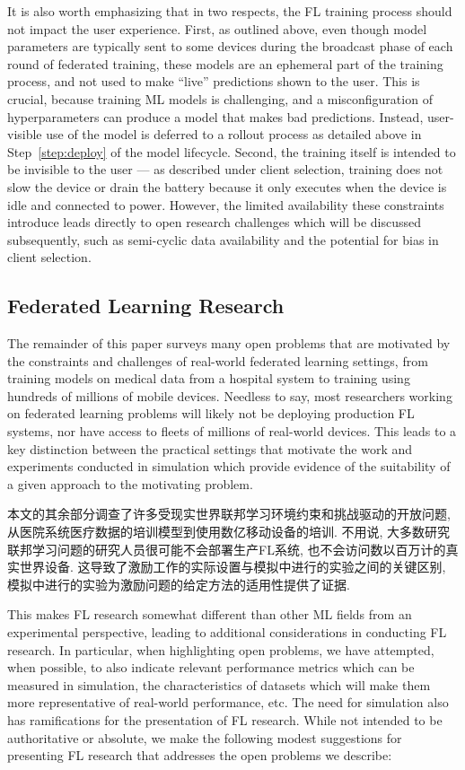 It is also worth emphasizing that in two respects, the FL training process should not impact the user experience. First, as outlined above, even though model parameters are typically sent to some devices during the broadcast phase of each round of federated training, these models are an ephemeral part of the training process, and not used to make ``live'' predictions shown to the user.  This is crucial, because training ML models is challenging, and a misconfiguration of hyperparameters can produce a model that makes bad predictions. Instead, user-visible use of the model is deferred to a rollout process as detailed above in Step~\ref{step:deploy} of the model lifecycle. Second, the training itself is intended to be invisible to the user --- as described under client selection, training does not slow the device or drain the battery because it only executes when the device is idle and connected to power. However, the limited availability these constraints introduce leads directly to open research challenges which will be discussed subsequently, such as semi-cyclic data availability and the potential for bias in client selection. 


\subsection{Federated Learning Research}\label{sec:fl-research}
The remainder of this paper surveys many open problems that are motivated by the constraints and challenges of real-world federated learning settings, from training models on medical data from a hospital system to training using hundreds of millions of mobile devices. Needless to say, most researchers working on federated learning problems will likely not be deploying production FL systems, nor have access to fleets of millions of real-world devices. This leads to a key distinction between the practical settings that motivate the work and experiments conducted in simulation which provide evidence of the suitability of a given approach to the motivating problem.

本文的其余部分调查了许多受现实世界联邦学习环境约束和挑战驱动的开放问题, 从医院系统医疗数据的培训模型到使用数亿移动设备的培训. 不用说, 大多数研究联邦学习问题的研究人员很可能不会部署生产FL系统, 也不会访问数以百万计的真实世界设备. 这导致了激励工作的实际设置与模拟中进行的实验之间的关键区别, 模拟中进行的实验为激励问题的给定方法的适用性提供了证据. 

This makes FL research somewhat different than other ML fields from an experimental perspective, leading to additional considerations in conducting FL research. In particular, when highlighting open problems, we have attempted, when possible, to also indicate relevant performance metrics which can be measured in simulation, the characteristics of datasets which will make them more representative of real-world performance, etc. The need for simulation also has ramifications for the presentation of FL research. While not intended to be authoritative or absolute, we make the following modest suggestions for presenting FL research that addresses the open problems we describe:


